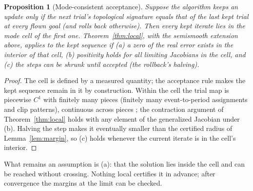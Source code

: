 \documentclass[11pt]{article}
\newtheorem{proposition}[theorem]{Proposition}
\theoremstyle{definition}
\theoremstyle{remark}
\begin{document}
\begin{proposition}[Mode-consistent acceptance]\label{prop:modeaccept}
Suppose the algorithm keeps an update only if the next trial's topological signature equals that of the last kept trial
at every flown goal (and rolls back otherwise). Then every kept iterate lies in the mode cell of the first one.
Theorem~\ref{thm:local}, with the semismooth extension above, applies to the kept sequence if (a) a zero of the real
error exists in the interior of that cell, (b) positivity holds for all limiting Jacobians in the cell, and (c) the steps
can be shrunk until accepted (the rollback's halving).
\end{proposition}
\begin{proof}
The cell is defined by a measured quantity; the acceptance rule makes the kept sequence remain in it by construction.
Within the cell the trial map is piecewise $C^1$ with finitely many pieces (finitely many event-to-period assignments
and clip patterns), continuous across pieces \cite{burden2016pwd}; the contraction argument of Theorem~\ref{thm:local}
holds with any element of the generalized Jacobian under (b). Halving the step makes it eventually smaller than the
certified radius of Lemma~\ref{lem:margin}, so (c) holds whenever the current iterate is in the cell's interior.
\end{proof}
What remains an assumption is (a): that the solution lies inside the cell and can be reached without crossing.
Nothing local certifies it in advance; after convergence the margins at the limit can be checked.
\end{document}
